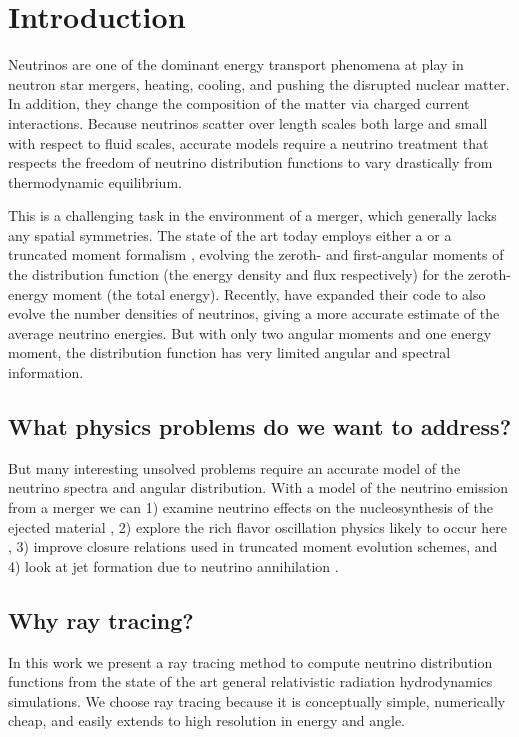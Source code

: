 \documentclass[aps,prd,twocolumn,superscriptaddress,groupedaddress]{revtex4}
\begin{document}
\section{Introduction}
Neutrinos are one of the dominant energy transport phenomena at play in
neutron star mergers, heating, cooling, and pushing the disrupted nuclear
matter.
In addition, they change the composition of the matter via charged current
interactions.
Because neutrinos scatter over length scales both large and small with
respect to fluid scales, accurate models require a neutrino treatment that
respects the freedom of neutrino distribution functions to vary
drastically from thermodynamic equilibrium.

This is a challenging task in the environment of a merger,
which generally lacks any spatial symmetries.
The state of the art today employs either a
or a truncated moment formalism
\citep{fouc2015-m1_nsbh, fouc2016-m1_nsns},
evolving the zeroth- and first-angular moments of the distribution function
(the energy density and flux respectively) for the zeroth-energy moment
(the total energy).
Recently, \cite{fouc2016-m1_evolve_n} have expanded their code to also evolve
the number densities of neutrinos, giving a more accurate estimate of the
average neutrino energies.
But with only two angular moments and one energy moment, the distribution
function has very limited angular and spectral information.

\subsection{What physics problems do we want to address?}
But many interesting unsolved problems require an accurate model of the neutrino
spectra and angular distribution.
With a model of the neutrino emission from a merger we can
1) examine neutrino effects on the nucleosynthesis of the ejected material
\citep{robe2016-sph_nu_nucleo},
2) explore the rich flavor oscillation physics likely to occur here
\citep{malk2012-mnr_1, malk2015-mnr_2, malk2016-mnr_3, zhu2016-mnr_nsns_remnant,
  vaan2016-uncovering_mnr},
3) improve closure relations used in truncated moment evolution schemes, and
4) look at jet formation due to neutrino annihilation
\citep{birk2007-nunubar, hari2010-gr_nunubar_collapsar, ?}.

\subsection{Why ray tracing?}
In this work we present a ray tracing method to compute neutrino distribution
functions from the state of the art general relativistic radiation
hydrodynamics simulations.
We choose ray tracing because it is conceptually simple, numerically cheap,
and easily extends to high resolution in energy and angle.
\end{document}
